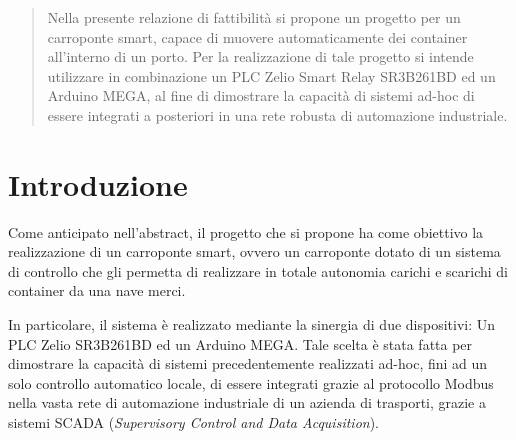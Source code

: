 

\SetupMinted{}
\pagestyle{empty}




\begin{abstract}
    Nella presente relazione di fattibilità si propone un progetto per un carroponte smart, capace
    di muovere automaticamente dei container all'interno di un porto. Per la realizzazione di tale
    progetto si intende utilizzare in combinazione un PLC Zelio Smart Relay SR3B261BD ed un Arduino
    MEGA, al fine di dimostrare la capacità di sistemi ad-hoc di essere integrati a posteriori in
    una rete robusta di automazione industriale.
\end{abstract}

\section{Introduzione}

Come anticipato nell'abstract, il progetto che si propone ha come obiettivo la realizzazione di un
carroponte smart, ovvero un carroponte dotato di un sistema di controllo che gli permetta di
realizzare in totale autonomia carichi e scarichi di container da una nave merci. \cite{ren2021design,gupta2004simplified}

In particolare, il sistema è realizzato mediante la sinergia di due dispositivi: Un PLC Zelio
SR3B261BD ed un Arduino MEGA. Tale scelta è stata fatta per dimostrare la capacità di sistemi
precedentemente realizzati ad-hoc, fini ad un solo controllo automatico locale, di essere integrati
grazie al protocollo Modbus nella vasta rete di automazione industriale di un azienda di trasporti,
grazie a sistemi SCADA (\emph{Supervisory Control and Data Acquisition}). \cite{li2015data,arm2015real}

